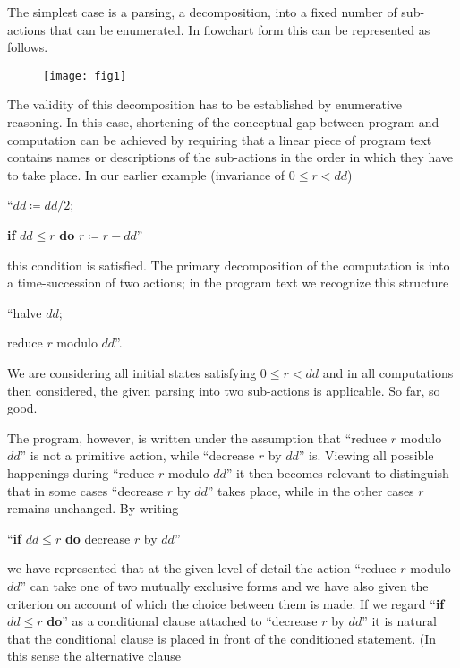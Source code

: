 The simplest case is a parsing, a decomposition, into a fixed number of sub-actions that can be enumerated. In flowchart form this can be represented as follows. 

\begin{figure}[h]
	\centering
	\texttt{[image: fig1]}
\end{figure}

The validity of this decomposition has to be established by enumerative reasoning. In this case, shortening of the conceptual gap between program and computation can be achieved by requiring that a linear piece of program text contains names or descriptions of the sub-actions in the order in which they have to take place. In our earlier example (invariance of $0 \leqslant r < dd$)
\medskip

{
	\setlength{\parindent}{8em}
	\hspace{-.4em}``$dd \coloneq dd/2;$
	
	\textbf{if} $dd \leqslant r$ \textbf{do} $r \coloneq r - dd$''
}
\medskip

\noindent
this condition is satisfied. The primary decomposition of the computation is into a time-succession of two actions; in the program text we recognize this structure
\medskip

{
	\setlength{\parindent}{8em}
	\hspace{-.4em}``halve $dd;$
	
	reduce $r$ modulo $dd$''.
}
\medskip

We are considering all initial states satisfying $0 \leqslant r < dd$ and in all computations then considered, the given parsing into two sub-actions is applicable. So far, so good.

The program, however, is written under the assumption that ``reduce $r$ modulo $dd$'' is not a primitive action, while ``decrease $r$ by $dd$'' is. Viewing all possible happenings during ``reduce $r$ modulo $dd$'' it then becomes relevant to distinguish that in some cases ``decrease $r$ by $dd$'' takes place, while in the other cases $r$ remains unchanged. By writing
\medskip

{
	\setlength{\parindent}{8em}
	\hspace{-.4em}``\textbf{if} $dd \leqslant r$ \textbf{do} decrease $r$ by $dd$''
}
\medskip

\noindent
we have represented that at the given level of detail the action ``reduce $r$ modulo $dd$'' can take one of two mutually exclusive forms and we have also given the criterion on account of which the choice between them is made. If we regard ``\textbf{if} $dd \leqslant r$ \textbf{do}'' as a conditional clause attached to ``decrease $r$ by $dd$'' it is natural that the conditional clause is placed in front of the conditioned statement. (In this sense the alternative clause
\medskip

